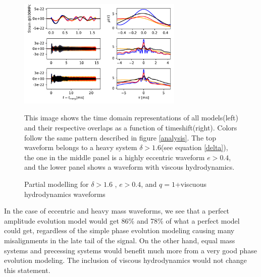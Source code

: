 \begin{figure}[hbt!]
\begin{center}
\includegraphics[width=0.7\textwidth, angle=0]{images/Data_analysis/results/phi-A2.pdf}
\caption{Partial modelling for $\delta>1.6$ , $e>0.4$, and $q=1$+viscuous hydrodynamics waveforms}
\end{center}
This image shows the time domain representations of all models(left) and their respective overlaps as a function of timeshift(right). Colors follow the same pattern described in figure \ref{analysis}. The top waveform belongs to a heavy system $\delta>1.6$(see equation \ref{delta}), the one in the middle panel is a highly eccentric waveform $e>0.4$, and the lower panel shows a waveform with viscous hydrodynamics.
\end{figure}
\FloatBarrier


In the case of eccentric and heavy mass waveforms, we see that a perfect amplitude evolution model would get 86\%  and 78\% of what a perfect model could get, regardless of the simple phase evolution modeling causing many misalignments in the late tail of the signal. On the other hand, equal mass systems and precessing systems would benefit much more from a very good phase evolution modeling. The inclusion of viscous hydrodynamics would not change this statement.


